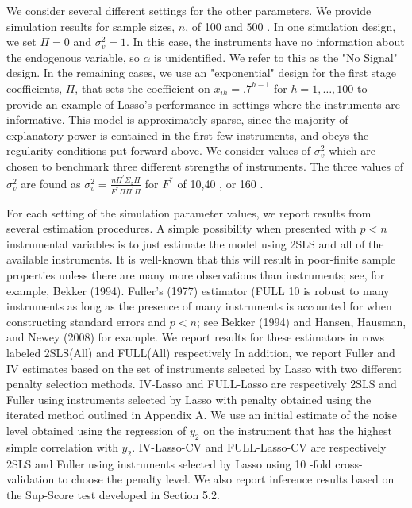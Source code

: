 \documentclass[10pt]{article}
\begin{document}
We consider several different settings for the other parameters. We provide simulation results for sample sizes, \(n\), of 100 and 500 . In one simulation design, we set \(\Pi=0\) and \(\sigma_{v}^{2}=1\). In this case, the instruments have no information about the endogenous variable, so \(\alpha\) is unidentified. We refer to this as the "No Signal" design. In the remaining cases, we use an "exponential" design for the first stage coefficients, \(\Pi\), that sets the coefficient on \(x_{i h}=.7^{h-1}\) for \(h=1, \ldots, 100\) to provide an example of Lasso's performance in settings where the instruments are informative. This model is approximately sparse, since the majority of explanatory power is contained in the first few instruments, and obeys the regularity conditions put forward above. We consider values of \(\sigma_{v}^{2}\) which are chosen to benchmark three different strengths of instruments. The three values of \(\sigma_{v}^{2}\) are found as \(\sigma_{v}^{2}=\frac{n \Pi^{\prime} \Sigma_{z} \Pi}{F^{*} \Pi \Pi^{\prime} \Pi}\) for \(F^{*}\) of 10,40 , or 160 .

For each setting of the simulation parameter values, we report results from several estimation procedures. A simple possibility when presented with \(p<n\) instrumental variables is to just estimate the model using 2SLS and all of the available instruments. It is well-known that this will result in poor-finite sample properties unless there are many more observations than instruments; see, for example, Bekker (1994). Fuller's (1977) estimator (FULL 10 is robust to many instruments as long as the presence of many instruments is accounted for when constructing standard errors and \(p<n\); see Bekker (1994) and Hansen, Hausman, and Newey (2008) for example. We report results for these estimators in rows labeled 2SLS(All) and FULL(All) respectively In addition, we report Fuller and IV estimates based on the set of instruments selected by Lasso with two different penalty selection methods. IV-Lasso and FULL-Lasso are respectively 2SLS and Fuller using instruments selected by Lasso with penalty obtained using the iterated method outlined in Appendix A. We use an initial estimate of the noise level obtained using the regression of \(y_{2}\) on the instrument that has the highest simple correlation with \(y_{2}\). IV-Lasso-CV and FULL-Lasso-CV are respectively 2SLS and Fuller using instruments selected by Lasso using 10 -fold cross-validation to choose the penalty level. We also report inference results based on the Sup-Score test developed in Section 5.2.
\end{document}
